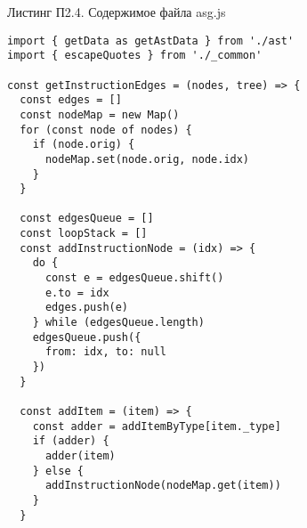 \begin{flushright}
Листинг П2.4. Содержимое файла asg.js
\end{flushright}

\begin{lstlisting}
import { getData as getAstData } from './ast'
import { escapeQuotes } from './_common'

const getInstructionEdges = (nodes, tree) => {
  const edges = []
  const nodeMap = new Map()
  for (const node of nodes) {
    if (node.orig) {
      nodeMap.set(node.orig, node.idx)
    }
  }

  const edgesQueue = []
  const loopStack = []
  const addInstructionNode = (idx) => {
    do {
      const e = edgesQueue.shift()
      e.to = idx
      edges.push(e)
    } while (edgesQueue.length)
    edgesQueue.push({
      from: idx, to: null
    })
  }

  const addItem = (item) => {
    const adder = addItemByType[item._type]
    if (adder) {
      adder(item)
    } else {
      addInstructionNode(nodeMap.get(item))
    }
  }


\end{lstlisting}
